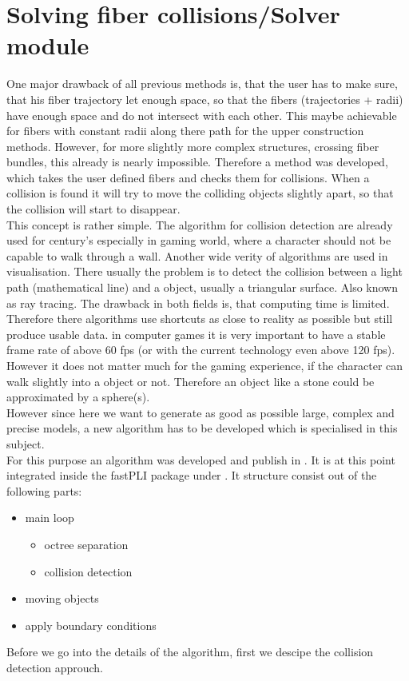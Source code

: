 \section{Solving fiber collisions/Solver module}
% 
One major drawback of all previous methods is, that the user has to make sure, that his fiber trajectory let enough space, so that the fibers (trajectories + radii) have enough space and do not intersect with each other.
This maybe achievable for fibers with constant radii along there path for the upper construction methods.
However, for more slightly more complex structures, \eg crossing fiber bundles, this already is nearly impossible.
Therefore a method was developed, which takes the user defined fibers and checks them for collisions.
When a collision is found it will try to move the colliding objects slightly apart, so that the collision will start to disappear.
\\
% 
This concept is rather simple.
The algorithm for collision detection are already used for century's especially in gaming world, where a character \eg should not be capable to walk through a wall. Another wide verity of algorithms are used in visualisation. There usually the problem is to detect the collision between a light path (mathematical line) and a object, usually a triangular surface. Also known as ray tracing.
The drawback in both fields is, that computing time is limited.
Therefore there algorithms use shortcuts as close to reality as possible but still produce usable data. \eg in computer games it is very important to have a stable frame rate of above $\num{60}$ \ac{fps} (or with the current technology even above 120 \ac{fps}).
However it does not matter much for the gaming experience, if the character can walk slightly into a object or not.
Therefore an object like a stone could be approximated by a sphere(s).
\\
%
However since here we want to generate as good as possible large, complex and precise models, a new algorithm has to be developed which is specialised in this subject.
% 
\\[\baselineskip]
% 
For this purpose an algorithm was developed and publish in \cite{matuschke2019}.
It is at this point integrated inside the \ac{fastPLI} package under .
It structure consist out of the following parts:
\begin{itemize}
\item main loop
\begin{itemize}
    \item octree separation
    \item collision detection
\end{itemize}
\item moving objects
\item apply boundary conditions
\end{itemize}
% 
Before we go into the details of the algorithm, first we descipe the collision detection approuch.

